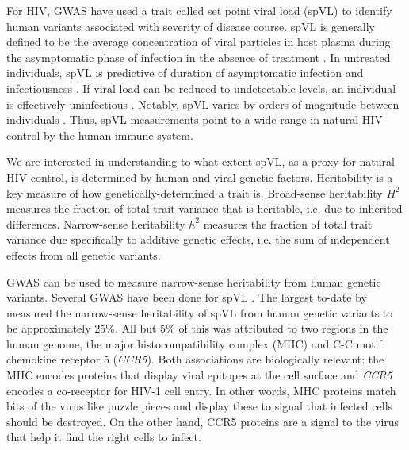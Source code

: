 \documentclass[]{article}
\begin{document}
\begin{doublespace}
For HIV, GWAS have used a trait called set point viral load (spVL) to identify human variants associated with severity of disease course. spVL is generally defined to be the average concentration of viral particles in host plasma during the asymptomatic phase of infection in the absence of treatment \parencite{Mellors1996}. In untreated individuals, spVL is predictive of duration of asymptomatic infection \parencite{Mellors1996} and infectiousness \parencite{Quinn2000}. If viral load can be reduced to undetectable levels, an individual is effectively uninfectious \parencite{HHSARTGuidelines2019}. Notably, spVL varies by orders of magnitude between individuals \parencite{Mellors1996}. Thus, spVL measurements point to a wide range in natural HIV control by the human immune system. 

We are interested in understanding to what extent spVL, as a proxy for natural HIV control, is determined by human and viral genetic factors. Heritability is a key measure of how genetically-determined a trait is. Broad-sense heritability $H^2$ measures the fraction of total trait variance that is heritable, i.e. due to inherited differences. Narrow-sense heritability $h^2$ measures the fraction of total trait variance due specifically to additive genetic effects, i.e. the sum of independent effects from all genetic variants. 

GWAS can be used to measure narrow-sense heritability from human genetic variants. Several GWAS have been done for spVL \parencite{Bartha2013, Dalmasso2008, Fellay2007, Pereyra2010, Fellay2009, Pelak2010, VanManen2011, McLaren2012}. The largest to-date by \citet{McLaren2015} measured the narrow-sense heritability of spVL from human genetic variants to be approximately 25\%. All but 5\% of this was attributed to two regions in the human genome, the major histocompatibility complex (MHC) and C-C motif chemokine receptor 5 (\emph{CCR5}). Both associations are biologically relevant: the MHC encodes proteins that display viral epitopes at the cell surface and \emph{CCR5} encodes a co-receptor for HIV-1 cell entry. In other words, MHC proteins match bits of the virus like puzzle pieces and display these to signal that infected cells should be destroyed. On the other hand, CCR5 proteins are a signal to the virus that help it find the right cells to infect.


\end{doublespace}
\end{document}

